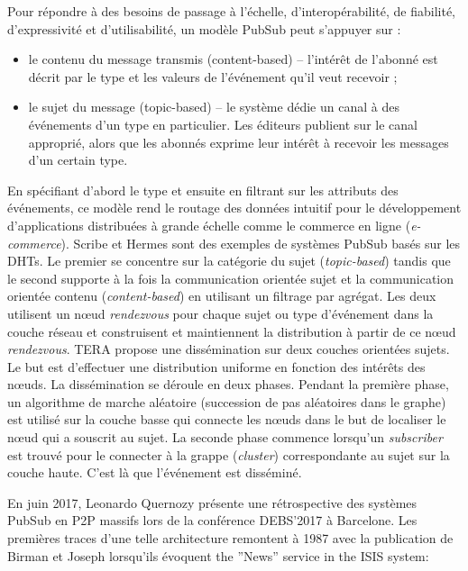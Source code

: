 Pour répondre à des besoins de passage à l'échelle, d'interopérabilité, de fiabilité, 
d'expressivité et d'utilisabilité, un modèle \gls{PubSub} peut s'appuyer sur :
\begin{itemize}
\item
 le contenu du message transmis (content-based)  -- l'intérêt de l'abonné est décrit par le type et les valeurs de l'événement qu'il veut recevoir ;
\item le sujet du message (topic-based) -- le système dédie un canal à des événements d'un type en particulier. Les éditeurs publient sur le canal approprié, alors que les abonnés exprime leur intérêt à recevoir les messages d'un certain type.  
\end{itemize}
En spécifiant d'abord le type et ensuite en filtrant sur les attributs des 
événements, ce modèle rend le routage des données intuitif pour le 
développement d'applications distribuées à grande échelle comme le commerce 
en ligne (\textit{e-commerce}). Scribe \cite{Castro2002} et Hermes 
\cite{Pietzuch2002} sont des exemples de systèmes \gls{PubSub} basés sur les 
\glspl{DHT}. 
Le premier se concentre sur la catégorie du sujet (\textit{topic-based}) tandis que 
le second supporte à la fois la communication orientée sujet et la communication 
orientée contenu (\textit{content-based}) en utilisant un 
filtrage par agrégat. Les deux utilisent un n\oe ud \textit{rendezvous} pour chaque 
sujet ou type d'événement dans la couche réseau et construisent et maintiennent la 
distribution à partir de ce n\oe ud \textit{rendezvous}. TERA \cite{Baldoni2007} 
propose une dissémination sur deux couches orientées sujets. Le but est d'effectuer 
une distribution uniforme en fonction des intérêts des n\oe uds. La dissémination 
se déroule en deux phases. Pendant la première phase, un algorithme de marche aléatoire (succession de pas aléatoires dans le graphe)
est utilisé sur la couche basse qui connecte les n\oe uds dans le but de localiser 
le n\oe ud qui a souscrit au sujet. La seconde phase commence lorsqu'un 
\textit{subscriber} est trouvé pour le connecter à la grappe (\textit{cluster}) correspondante au 
sujet  sur la couche haute. C'est là que l'événement est disséminé.

En juin 2017, Leonardo Quernozy présente une rétrospective des systèmes 
\gls{PubSub} en \gls{P2P} massifs lors de la conférence DEBS'2017 à 
Barcelone. 
Les premières traces d'une telle architecture remontent à 1987 avec 
la publication de Birman et Joseph \cite{Birman1987} lorsqu'ils évoquent \og 
the ''News'' service in the ISIS system\fg{}:

